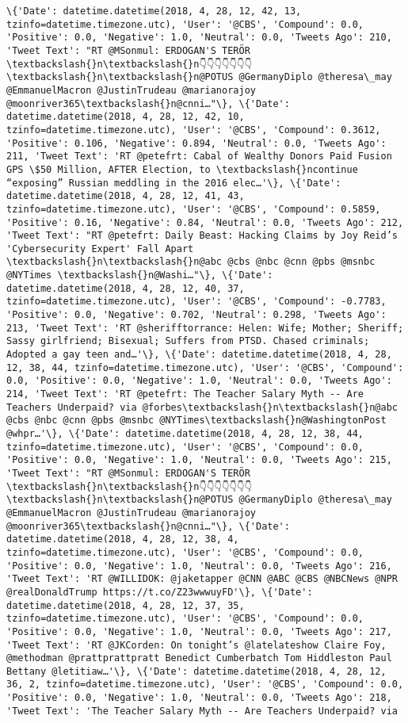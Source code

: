 \documentclass[11pt]{article}
\begin{document}
\begin{Verbatim}[commandchars=\\\{\}]
\{'Date': datetime.datetime(2018, 4, 28, 12, 42, 13, tzinfo=datetime.timezone.utc), 'User': '@CBS', 'Compound': 0.0, 'Positive': 0.0, 'Negative': 1.0, 'Neutral': 0.0, 'Tweets Ago': 210, 'Tweet Text': "RT @MSonmul: ERDOGAN'S TERÖR \textbackslash{}n\textbackslash{}n👇👇👇👇👇👇👇\textbackslash{}n\textbackslash{}n@POTUS @GermanyDiplo @theresa\_may @EmmanuelMacron @JustinTrudeau @marianorajoy @moonriver365\textbackslash{}n@cnni…"\}, \{'Date': datetime.datetime(2018, 4, 28, 12, 42, 10, tzinfo=datetime.timezone.utc), 'User': '@CBS', 'Compound': 0.3612, 'Positive': 0.106, 'Negative': 0.894, 'Neutral': 0.0, 'Tweets Ago': 211, 'Tweet Text': 'RT @petefrt: Cabal of Wealthy Donors Paid Fusion GPS \$50 Million, AFTER Election, to \textbackslash{}ncontinue “exposing” Russian meddling in the 2016 elec…'\}, \{'Date': datetime.datetime(2018, 4, 28, 12, 41, 43, tzinfo=datetime.timezone.utc), 'User': '@CBS', 'Compound': 0.5859, 'Positive': 0.16, 'Negative': 0.84, 'Neutral': 0.0, 'Tweets Ago': 212, 'Tweet Text': "RT @petefrt: Daily Beast: Hacking Claims by Joy Reid’s 'Cybersecurity Expert' Fall Apart \textbackslash{}n\textbackslash{}n@abc @cbs @nbc @cnn @pbs @msnbc @NYTimes \textbackslash{}n@Washi…"\}, \{'Date': datetime.datetime(2018, 4, 28, 12, 40, 37, tzinfo=datetime.timezone.utc), 'User': '@CBS', 'Compound': -0.7783, 'Positive': 0.0, 'Negative': 0.702, 'Neutral': 0.298, 'Tweets Ago': 213, 'Tweet Text': 'RT @sherifftorrance: Helen: Wife; Mother; Sheriff; Sassy girlfriend; Bisexual; Suffers from PTSD. Chased criminals; Adopted a gay teen and…'\}, \{'Date': datetime.datetime(2018, 4, 28, 12, 38, 44, tzinfo=datetime.timezone.utc), 'User': '@CBS', 'Compound': 0.0, 'Positive': 0.0, 'Negative': 1.0, 'Neutral': 0.0, 'Tweets Ago': 214, 'Tweet Text': 'RT @petefrt: The Teacher Salary Myth -- Are Teachers Underpaid? via @forbes\textbackslash{}n\textbackslash{}n@abc @cbs @nbc @cnn @pbs @msnbc @NYTimes\textbackslash{}n@WashingtonPost @whpr…'\}, \{'Date': datetime.datetime(2018, 4, 28, 12, 38, 44, tzinfo=datetime.timezone.utc), 'User': '@CBS', 'Compound': 0.0, 'Positive': 0.0, 'Negative': 1.0, 'Neutral': 0.0, 'Tweets Ago': 215, 'Tweet Text': "RT @MSonmul: ERDOGAN'S TERÖR \textbackslash{}n\textbackslash{}n👇👇👇👇👇👇👇\textbackslash{}n\textbackslash{}n@POTUS @GermanyDiplo @theresa\_may @EmmanuelMacron @JustinTrudeau @marianorajoy @moonriver365\textbackslash{}n@cnni…"\}, \{'Date': datetime.datetime(2018, 4, 28, 12, 38, 4, tzinfo=datetime.timezone.utc), 'User': '@CBS', 'Compound': 0.0, 'Positive': 0.0, 'Negative': 1.0, 'Neutral': 0.0, 'Tweets Ago': 216, 'Tweet Text': 'RT @WILLIDOK: @jaketapper @CNN @ABC @CBS @NBCNews @NPR @realDonaldTrump https://t.co/Z23wwwuyFD'\}, \{'Date': datetime.datetime(2018, 4, 28, 12, 37, 35, tzinfo=datetime.timezone.utc), 'User': '@CBS', 'Compound': 0.0, 'Positive': 0.0, 'Negative': 1.0, 'Neutral': 0.0, 'Tweets Ago': 217, 'Tweet Text': 'RT @JKCorden: On tonight’s @latelateshow Claire Foy, @methodman @prattprattpratt Benedict Cumberbatch Tom Hiddleston Paul Bettany @letitiaw…'\}, \{'Date': datetime.datetime(2018, 4, 28, 12, 36, 2, tzinfo=datetime.timezone.utc), 'User': '@CBS', 'Compound': 0.0, 'Positive': 0.0, 'Negative': 1.0, 'Neutral': 0.0, 'Tweets Ago': 218, 'Tweet Text': 'The Teacher Salary Myth -- Are Teachers Underpaid? via 
\end{Verbatim}
\end{document}
